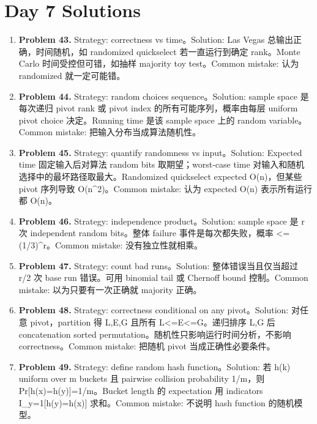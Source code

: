 \documentclass[11pt]{ctexart}
\begin{document}
\section{Day 7 Solutions}
\begin{enumerate}
  \item \textbf{Problem 43.} Strategy: correctness vs time。Solution: Las Vegas 总输出正确，时间随机，如 randomized quickselect 若一直运行到确定 rank。Monte Carlo 时间受控但可错，如抽样 majority toy test。Common mistake: 认为 randomized 就一定可能错。
  \item \textbf{Problem 44.} Strategy: random choices sequence。Solution: sample space 是每次递归 pivot rank 或 pivot index 的所有可能序列，概率由每层 uniform pivot choice 决定。Running time 是该 sample space 上的 random variable。Common mistake: 把输入分布当成算法随机性。
  \item \textbf{Problem 45.} Strategy: quantify randomness vs input。Solution: Expected time 固定输入后对算法 random bits 取期望；worst-case time 对输入和随机选择中的最坏路径取最大。Randomized quickselect expected O(n)，但某些 pivot 序列导致 O(n\textasciicircum{}2)。Common mistake: 认为 expected O(n) 表示所有运行都 O(n)。
  \item \textbf{Problem 46.} Strategy: independence product。Solution: sample space 是 r 次 independent random bits。整体 failure 事件是每次都失败，概率 <=(1/3)\textasciicircum{}r。Common mistake: 没有独立性就相乘。
  \item \textbf{Problem 47.} Strategy: count bad runs。Solution: 整体错误当且仅当超过 r/2 次 base run 错误。可用 binomial tail 或 Chernoff bound 控制。Common mistake: 以为只要有一次正确就 majority 正确。
  \item \textbf{Problem 48.} Strategy: correctness conditional on any pivot。Solution: 对任意 pivot，partition 得 L,E,G 且所有 L<=E<=G。递归排序 L,G 后 concatenation sorted permutation。随机性只影响运行时间分析，不影响 correctness。Common mistake: 把随机 pivot 当成正确性必要条件。
  \item \textbf{Problem 49.} Strategy: define random hash function。Solution: 若 h(k) uniform over m buckets 且 pairwise collision probability 1/m，则 Pr[h(x)=h(y)]=1/m。Bucket length 的 expectation 用 indicators I\_y=1[h(y)=h(x)] 求和。Common mistake: 不说明 hash function 的随机模型。
\end{enumerate}
\end{document}
